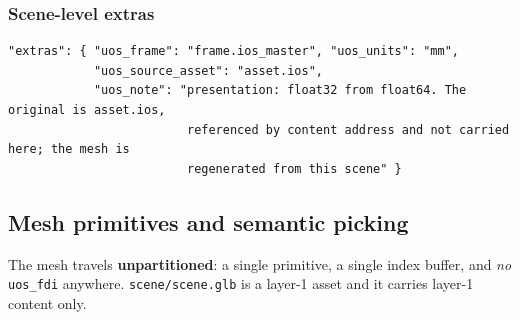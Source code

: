 \documentclass[11pt,a4paper]{article}
\newcommand{\code}[1]{\texttt{\small #1}}
\begin{document}
\subsubsection{Scene-level extras}
\begin{lstlisting}[style=js]
"extras": { "uos_frame": "frame.ios_master", "uos_units": "mm",
            "uos_source_asset": "asset.ios",
            "uos_note": "presentation: float32 from float64. The original is asset.ios,
                         referenced by content address and not carried here; the mesh is
                         regenerated from this scene" }
\end{lstlisting}

\subsection{Mesh primitives and semantic picking}\label{sec:picking}

The mesh travels \textbf{unpartitioned}: a single primitive, a single index buffer, and
\emph{no} \code{uos\_fdi} anywhere. \code{scene/scene.glb} is a layer-1 asset and it
carries layer-1 content only.
\end{document}
